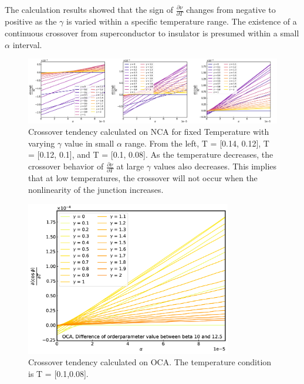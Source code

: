 \documentclass{article}[12pt]
\numberwithin{equation}{section}
\begin{document}
\begin{spacing}{1.5}
The calculation results showed that the sign of $\frac{\partial \nu}{\partial T}$ changes from negative to positive 
as the $\gamma$ is varied within a specific temperature range. The existence of a continuous crossover from superconductor 
to insulator is presumed within a small $\alpha$ interval.
\pagebreak
\begin{figure}[H]
  \vfill
  \centerline{\includegraphics[width=15cm]{TexFigure/4/4_3_13_litlalp_1.png}}
  \caption{Crossover tendency calculated on NCA for fixed Temperature with varying $\gamma$ value in small $\alpha$ range. From the left, T = [0.14, 0.12], T = [0.12, 0.1], and T = [0.1, 0.08]. As the temperature decreases, the crossover behavior of $\frac{\partial \nu}{\partial T}$ 
  at large $\gamma$ values also decreases. This implies that at low temperatures, the crossover will not occur when the nonlinearity of the junction increases.}
  \vfill
\end{figure}
\begin{figure}[H]
  \centerline{\includegraphics[width=9cm]{TexFigure/4/4_3_14_Diff_Os3_b_10_12.5_n.png}}
  \caption{Crossover tendency calculated on OCA. The temperature condition is T = [0.1,0.08].}
\vfill
\end{figure}
\pagebreak
\begin{figure}[H]
  \vfill

\end{figure}
\end{spacing}
\end{document}
